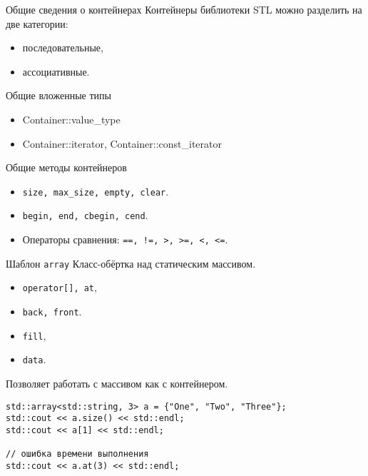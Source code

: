\documentclass{beamer}
\begin{document}
\begin{frame}{Общие сведения о контейнерах}
\small
    Контейнеры библиотеки STL можно разделить на две категории: 
    \begin{itemize}
        \item последовательные, 
        \item ассоциативные.
    \end{itemize}
    \begin{block}{Общие вложенные типы}
    \begin{itemize} \tt
        \item Container::value\_type
        \item Container::iterator, Container::const\_iterator
    \end{itemize}
    \end{block}\vspace{-3mm}
    \begin{block}{Общие методы контейнеров}
    \begin{itemize}
    \item \texttt{size, max\_size, empty, clear}.
    
    \item \texttt{begin, end, сbegin, сend}.

    \item Операторы сравнения: \texttt{==, !=, >, >=, <, <=}.
    \end{itemize}
\end{block}
\end{frame}

\begin{frame}[fragile]{Шаблон {\tt array}}
    Класс-обёртка над статическим массивом.

\begin{itemize}
    \item \texttt{operator[], at},
    \item {\tt back, front}.
    \item \texttt{fill},
    \item \texttt{data}.
\end{itemize}
Позволяет работать с массивом как с контейнером.

\begin{lstlisting}
std::array<std::string, 3> a = {"One", "Two", "Three"};
std::cout << a.size() << std::endl;
std::cout << a[1] << std::endl;

// ошибка времени выполнения
std::cout << a.at(3) << std::endl; 
\end{lstlisting}
\end{frame}
\end{document}
